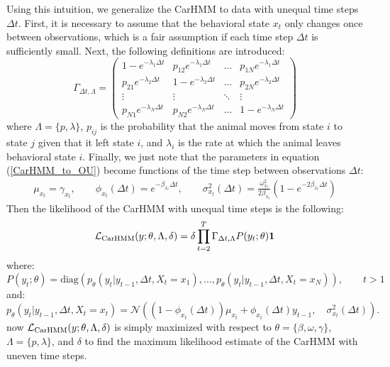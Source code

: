 Using this intuition, we generalize the CarHMM to data with unequal time steps $\Delta t$. First, it is necessary to assume that the behavioral state $x_t$ only changes once between observations, which is a fair assumption if each time step $\Delta t$ is sufficiently small. Next, the following definitions are introduced:
%
$$\Gamma_{\Delta t,\Lambda} = \begin{pmatrix} 
1-e^{-\lambda_1 \Delta t} & p_{12} e^{-\lambda_1 \Delta t} & \dots & p_{1N} e^{-\lambda_1 \Delta t} \\
p_{21} e^{-\lambda_2 \Delta t} & 1-e^{-\lambda_2 \Delta t} & \dots & p_{2N} e^{-\lambda_2 \Delta t} \\
\vdots & \vdots & \ddots & \vdots \\
p_{N1} e^{-\lambda_N \Delta t} & p_{N2} e^{-\lambda_N \Delta t} & \dots  & 1-e^{-\lambda_N \Delta t}
\end{pmatrix}$$
%
where $\Lambda = \{p,\lambda\}$, $p_{ij}$ is the probability that the animal moves from state $i$ to state $j$ given that it left state $i$, and $\lambda_i$ is the rate at which the animal leaves behavioral state $i$. Finally, we just note that the parameters in equation (\ref{CarHMM_to_OU}) become functions of the time step between observations $\Delta t$:
%
\begin{align*}
\mu_{x_t}= \gamma_{x_t}, \qquad \phi_{x_t}(\Delta t) = e^{-\beta_{x_t}\Delta t}, \qquad \sigma^2_{x_t}(\Delta t) = \frac{\omega_{x_t}^2}{2\beta_{x_t}} (1-e^{-2\beta_{x_t}\Delta t})
\end{align*}
%
Then the likelihood of the CarHMM with unequal time steps is the following:
%
$$\mathcal{L}_{\text{CarHMM}}(y;\theta,\Lambda,\delta) = \delta \prod_{t=2}^{T} \Gamma_{\Delta t,\Lambda} P(y_t;\theta) \mathbf{1}$$
%
where:
%
$$P(y_t;\theta) = \text{diag}(p_\theta(y_t|y_{t-1}, \Delta t, X_t = x_1), . . . , p_\theta(y_t|y_{t-1}, \Delta t, X_t = x_N )), \qquad t > 1$$
%
and:
%
$$p_\theta(y_t|y_{t-1}, \Delta t, X_t = x_t) = \mathcal{N}\left((1-\phi_{x_t}(\Delta t))\mu_{x_t} + \phi_{x_t}(\Delta t) y_{t-1},\quad \sigma_{x_t}^2(\Delta t) \right).$$
%
now $\mathcal{L}_{\text{CarHMM}}(y;\theta,\Lambda,\delta)$ is simply maximized with respect to $\theta = \{\beta,\omega,\gamma\}$, $\Lambda = \{p,\lambda\}$, and $\delta$ to find the maximum likelihood estimate of the CarHMM with uneven time steps.

\iffalse









